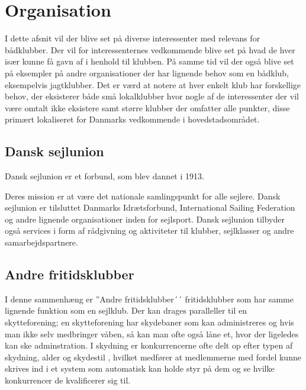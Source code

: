 \chapter{Organisation}\label{chap:organisation}


I dette afsnit vil der blive set på diverse interessenter med relevans for bådklubber. Der vil for
interessenternes vedkommende blive set på hvad de hver især kunne få gavn af i henhold til klubben. På
samme tid vil der også blive set på eksempler på andre organisationer der har lignende behov som en bådklub,
eksempelvis jagtklubber. Det er værd at notere at hver enkelt klub har forskellige behov, der eksisterer både
små lokalklubber hvor nogle af de interessenter der vil være omtalt ikke eksistere samt større klubber der
omfatter alle punkter, disse primært lokaliseret for Danmarks vedkommende i hovedstadsområdet.


\section{Dansk sejlunion}

Dansk sejlunion er et forbund, som blev dannet i 1913.

Deres mission er at være det nationale samlingspunkt for alle sejlere. Dansk sejlunion er tilsluttet Danmarks
Idrætsforbund, International Sailing Federation og andre lignende organisationer inden for sejlsport. Dansk
sejlunion tilbyder også services i form af rådgivning og aktiviteter til klubber, sejlklasser og andre
samarbejdspartnere.


\section{Andre fritidsklubber}

I denne sammenhæng er ''Andre fritidsklubber´´ fritidsklubber som har samme lignende funktion som en sejlklub.
Der kan drages paralleller til en skytteforening; en skytteforening har skydebaner som kan administreres og
hvis man ikke selv medbringer våben, så kan man ofte også låne et, hvor der ligeledes kan ske adminstration. I
skydning er konkurrencerne ofte delt op efter typen af skydning, alder og skydestil , hvilket
medfører at medlemmerne med fordel kunne skrives ind i et system som automatisk kan holde styr på dem og se
hvilke konkurrencer de kvalificerer sig til.


